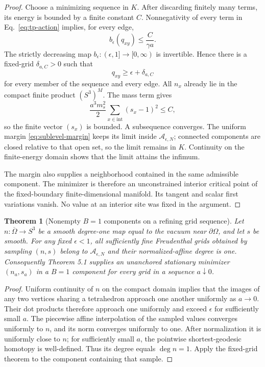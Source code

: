 \documentclass[11pt]{article}
\numberwithin{equation}{section}
\newtheorem{theorem}{Theorem}[section]
\theoremstyle{definition}
\theoremstyle{remark}
\newcommand{\cA}{\mathcal A}
\begin{document}
\begin{proof}
Choose a minimizing sequence in \(K\).  After discarding finitely many terms,
its energy is bounded by a finite constant \(C\).  Nonnegativity of every
term in Eq.~\eqref{eq:tp-action} implies, for every edge,
\begin{equation}
 b_\epsilon(q_{xy})\le\frac{C}{\gamma a}.
 \label{eq:barrier-sublevel}
\end{equation}
The strictly decreasing map
\(b_\epsilon:(\epsilon,1]\to[0,\infty)\) is invertible.  Hence there is a
fixed-grid \(\delta_{a,C}>0\) such that
\begin{equation}
 q_{xy}\ge\epsilon+\delta_{a,C}
 \label{eq:sublevel-margin}
\end{equation}
for every member of the sequence and every edge.  All \(n_x\) already lie in
the compact finite product \((S^3)^M\).  The mass term gives
\begin{equation}
 \frac{a^3m_s^2}{2}\sum_{x\in\mathrm{int}}(s_x-1)^2\le C,
 \label{eq:s-coercive}
\end{equation}
so the finite vector \((s_x)\) is bounded.  A subsequence converges.  The
uniform margin \eqref{eq:sublevel-margin} keeps its limit inside
\(\cA_{\epsilon,N}\); connected components are closed relative to that open
set, so the limit remains in \(K\).  Continuity on the finite-energy domain
shows that the limit attains the infimum.

The margin also supplies a neighborhood contained in the same admissible
component.  The minimizer is therefore an unconstrained interior critical
point of the fixed-boundary finite-dimensional manifold.  Its tangent and
scalar first variations vanish.  No value at an interior site was fixed in
the argument.
\end{proof}

\begin{theorem}[Nonempty \(B=1\) components on a refining grid sequence]
Let \(n:\overline\Omega\to S^3\) be a smooth degree-one map equal to the
vacuum near \(\partial\Omega\), and let \(s\) be smooth.  For any fixed
\(\epsilon<1\), all sufficiently fine Freudenthal grids obtained by sampling
\((n,s)\) belong to \(\cA_{\epsilon,N}\) and their normalized-affine degree
is one.  Consequently Theorem 5.1 supplies an unanchored stationary minimizer
\((n_a,s_a)\) in a \(B=1\) component for every grid in a sequence
\(a\downarrow0\).
\end{theorem}

\begin{proof}
Uniform continuity of \(n\) on the compact domain implies that the images of
any two vertices sharing a tetrahedron approach one another uniformly as
\(a\to0\).  Their dot products therefore approach one uniformly and exceed
\(\epsilon\) for sufficiently small \(a\).  The piecewise affine
interpolation of the sampled values converges uniformly to \(n\), and its
norm converges uniformly to one.  After normalization it is uniformly close
to \(n\); for sufficiently small \(a\), the pointwise shortest-geodesic
homotopy is well-defined.  Thus its degree equals \(\deg n=1\).  Apply the
fixed-grid theorem to the component containing that sample.
\end{proof}
\end{document}
